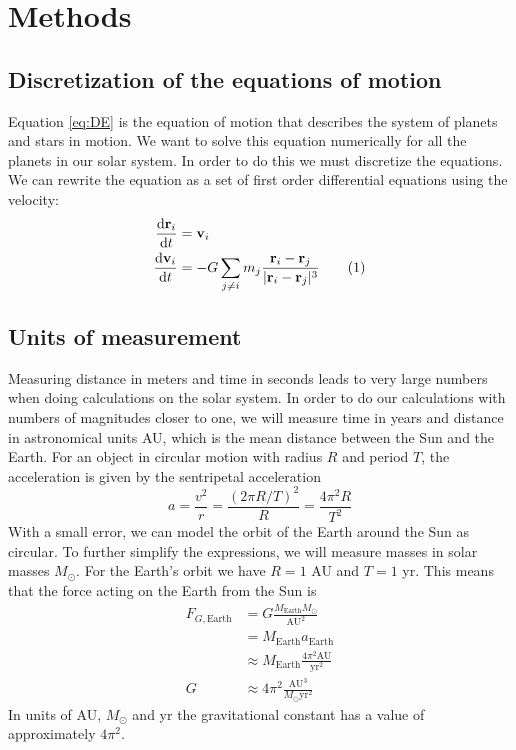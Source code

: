 \documentclass[reprint, english,notitlepage,nofootinbib]{revtex4-1}  %
\newcommand\numberthis{\addtocounter{equation}{1}\tag{\theequation}}
\newcommand{\vc}[1]{\mathbf{#1}}
\begin{document}
\section{Methods}

\subsection{Discretization of the equations of motion}

Equation \eqref{eq:DE} is the equation of motion that describes the system of planets and stars in motion. We want to solve this equation numerically for all the planets in our solar system. In order to do this we must discretize the equations. We can rewrite the equation as a set of first order differential equations using the velocity:
\begin{align*}
   \frac{\mathrm d \vc r_i}{\mathrm d t} &= \vc v_i \\
   \frac{\mathrm d \vc v_i}{\mathrm d t} &= - G \sum_{j \neq i} m_j \frac{\vc r_i - \vc r_j}{ \lvert \vc r_i - \vc r_j \rvert ^3} \numberthis \label{eq:eq_of_motion}
\end{align*}


\subsection{Units of measurement}

Measuring distance in meters and time in seconds leads to very large numbers when doing calculations on the solar system. In order to do our calculations with numbers of magnitudes closer to one, we will measure time in years and distance in astronomical units AU, which is the mean distance between the Sun and the Earth. For an object in circular motion with radius $R$ and period $T$, the acceleration is given by the sentripetal acceleration
\begin{equation*}
  a = \frac{v^2}{r} = \frac{(2 \pi R / T)^2}{R} = \frac{4 \pi^2 R}{T^2}
\end{equation*}
With a small error, we can model the orbit of the Earth around the Sun as circular. To further simplify the expressions, we will measure masses in solar masses $M_\odot$. For the Earth's orbit we have $R = 1$ AU and $T = 1$ yr. This means that the force acting on the Earth from the Sun is
\begin{align*}
  F_{G, \text{Earth}} &= G \frac{M_{\text{Earth}} M_\odot}{\text{AU}^2} \\
  &= M_{\text{Earth}} a_{\text{Earth}} \\
  &\approx M_{\text{Earth}} \frac{4 \pi^2 \text{AU}}{\text{yr}^2} \\
  G &\approx 4 \pi^2 \frac{\text{AU}^3}{M_\odot \text{yr}^2}
\end{align*}
In units of AU, $M_\odot$ and yr the gravitational constant has a value of approximately $4 \pi^2$.
\end{document}
